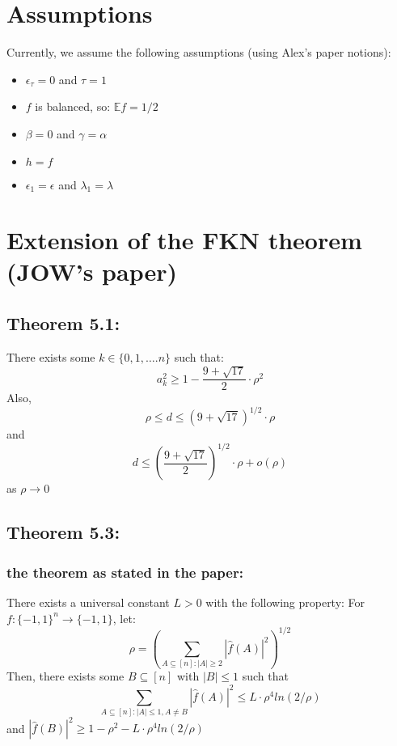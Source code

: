 \documentclass{article}
\author{Mahmoud Agbareya}
\date{5-Oct-2016}
\begin{document}
	\section{Assumptions}
		Currently, we assume the following assumptions (using Alex's paper notions):
		\begin{itemize}
			\item $ \epsilon_\tau = 0 $ and $ \tau = 1 $
			\item $f$ is balanced, so: $ \mathbb{E} f = 1/2 $
			\item $ \beta = 0 $ and $ \gamma = \alpha $
			\item $ h = f $
			\item $\epsilon_1 = \epsilon$ and $\lambda_1 = \lambda $
		\end{itemize}
		
		
	\section{Extension of the FKN theorem (JOW's paper)}
		\subsection{Theorem 5.1:}
			There exists some $ k \in \{0,1, \dots . n\} $ such that:
			$$ a_k^2 \geq 1 - \frac{9 + \sqrt{17}}{2} \cdot \rho^2 $$
			Also,
			\begin{equation} \label{thm5:1}
				\rho \leq d \leq \left( 9 + \sqrt{17} \right) ^ {1/2} \cdot \rho
			\end{equation}
			and
			\begin{equation} \label{thm5:2}
				d \leq \left( \frac{9 + \sqrt{17}}{2}  \right) ^ {1/2} \cdot \rho + o(\rho)
			\end{equation}
			as $ \rho \rightarrow 0 $
	
		\subsection{Theorem 5.3:}
			\subsubsection{the theorem as stated in the paper:}
				There exists a universal constant $L > 0$ with the following property: For $ f : \{-1,1\}^n \rightarrow \{-1,1\}$, let:
				$$ \rho = \left( \sum_{A \subseteq [n]: |A| \geq 2} |\hat{f}(A)|^2 \right) ^ {1/2} $$
				Then, there exists some $ B \subseteq [n] $ with $|B| \leq 1 $ such that
				$$ \sum_{A \subseteq [n]: |A| \leq 1, A \neq B} |\hat{f}(A)|^2 \leq L \cdot \rho^4 ln(2/\rho)$$
				and $ |\hat{f}(B)|^2 \geq 1 - \rho^2 - L \cdot \rho^4 ln(2/\rho) $
\end{document}
